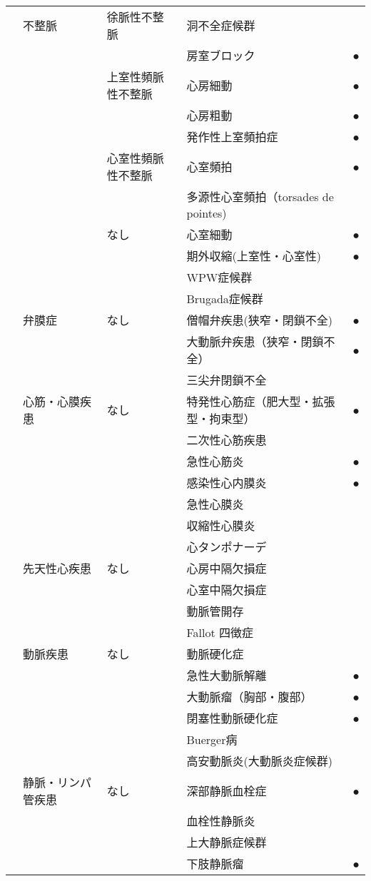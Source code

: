 \begin{xltabular}{\linewidth}{XXXXX}
 & 不整脈 & 徐脈性不整脈 & 洞不全症候群 &  \\
 &  &  & 房室ブロック & ● \\
 &  & 上室性頻脈性不整脈 & 心房細動 & ● \\
 &  &  & 心房粗動 & ● \\
 &  &  & 発作性上室頻拍症 & ● \\
 &  & 心室性頻脈性不整脈 & 心室頻拍 & ● \\
 &  &  & 多源性心室頻拍（torsades de pointes) &  \\
 &  & なし & 心室細動 & ● \\
 &  &  & 期外収縮(上室性・心室性) & ● \\
 &  &  & WPW症候群 &  \\
 &  &  & Brugada症候群 &  \\
 & 弁膜症 & なし & 僧帽弁疾患(狭窄・閉鎖不全) & ● \\
 &  &  & 大動脈弁疾患（狭窄・閉鎖不全） & ● \\
 &  &  & 三尖弁閉鎖不全 &  \\
 & 心筋・心膜疾患 & なし & 特発性心筋症（肥大型・拡張型・拘束型） & ● \\
 &  &  & 二次性心筋疾患 &  \\
 &  &  & 急性心筋炎 & ● \\
 &  &  & 感染性心内膜炎 & ● \\
 &  &  & 急性心膜炎 &  \\
 &  &  & 収縮性心膜炎 &  \\
 &  &  & 心タンポナーデ &  \\
 & 先天性心疾患 & なし & 心房中隔欠損症 &  \\
 &  &  & 心室中隔欠損症 &  \\
 &  &  & 動脈管開存 &  \\
 &  &  & Fallot 四徴症 &  \\
 & 動脈疾患 & なし & 動脈硬化症 &  \\
 &  &  & 急性大動脈解離 & ● \\
 &  &  & 大動脈瘤（胸部・腹部） & ● \\
 &  &  & 閉塞性動脈硬化症 & ● \\
 &  &  & Buerger病 &  \\
 &  &  & 高安動脈炎(大動脈炎症候群) &  \\
 & 静脈・リンパ管疾患 & なし & 深部静脈血栓症 & ● \\
 &  &  & 血栓性静脈炎 &  \\
 &  &  & 上大静脈症候群 &  \\
 &  &  & 下肢静脈瘤 & ● \\

\end{xltabular}
